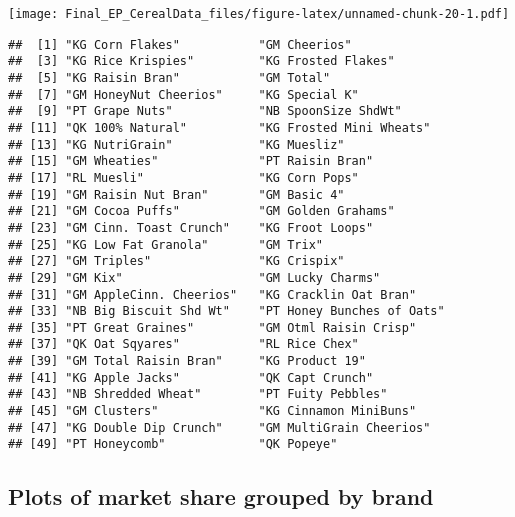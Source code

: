 \documentclass[
]{article}
\newenvironment{Shaded}{\begin{snugshade}}{\end{snugshade}}
\newcommand{\FunctionTok}[1]{\textcolor[rgb]{0.13,0.29,0.53}{\textbf{#1}}}
\newcommand{\NormalTok}[1]{#1}
\newcommand{\OtherTok}[1]{\textcolor[rgb]{0.56,0.35,0.01}{#1}}
\newcommand{\SpecialCharTok}[1]{\textcolor[rgb]{0.81,0.36,0.00}{\textbf{#1}}}
\begin{document}
\texttt{[image: Final\_EP\_CerealData\_files/figure-latex/unnamed-chunk-20-1.pdf]}

\begin{Shaded}
\end{Shaded}

\begin{verbatim}
##  [1] "KG Corn Flakes"           "GM Cheerios"             
##  [3] "KG Rice Krispies"         "KG Frosted Flakes"       
##  [5] "KG Raisin Bran"           "GM Total"                
##  [7] "GM HoneyNut Cheerios"     "KG Special K"            
##  [9] "PT Grape Nuts"            "NB SpoonSize ShdWt"      
## [11] "QK 100% Natural"          "KG Frosted Mini Wheats"  
## [13] "KG NutriGrain"            "KG Muesliz"              
## [15] "GM Wheaties"              "PT Raisin Bran"          
## [17] "RL Muesli"                "KG Corn Pops"            
## [19] "GM Raisin Nut Bran"       "GM Basic 4"              
## [21] "GM Cocoa Puffs"           "GM Golden Grahams"       
## [23] "GM Cinn. Toast Crunch"    "KG Froot Loops"          
## [25] "KG Low Fat Granola"       "GM Trix"                 
## [27] "GM Triples"               "KG Crispix"              
## [29] "GM Kix"                   "GM Lucky Charms"         
## [31] "GM AppleCinn. Cheerios"   "KG Cracklin Oat Bran"    
## [33] "NB Big Biscuit Shd Wt"    "PT Honey Bunches of Oats"
## [35] "PT Great Graines"         "GM Otml Raisin Crisp"    
## [37] "QK Oat Sqyares"           "RL Rice Chex"            
## [39] "GM Total Raisin Bran"     "KG Product 19"           
## [41] "KG Apple Jacks"           "QK Capt Crunch"          
## [43] "NB Shredded Wheat"        "PT Fuity Pebbles"        
## [45] "GM Clusters"              "KG Cinnamon MiniBuns"    
## [47] "KG Double Dip Crunch"     "GM MultiGrain Cheerios"  
## [49] "PT Honeycomb"             "QK Popeye"
\end{verbatim}

\subsection{Plots of market share grouped by
brand}\label{plots-of-market-share-grouped-by-brand-1}
\end{document}
